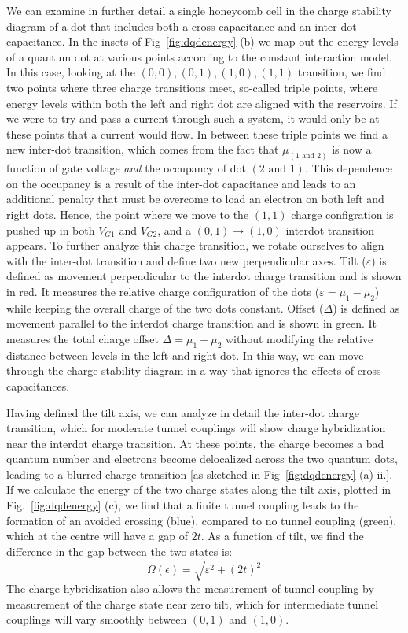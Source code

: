 We can examine in further detail a single honeycomb cell in the charge stability diagram of a dot that includes both a cross-capacitance and an inter-dot capacitance.
In the insets of Fig~\ref{fig:dqdenergy} (b) we map out the energy levels of a quantum dot at various points according to the constant interaction model.
In this case, looking at the $(0, 0), (0, 1), (1, 0), (1, 1)$ transition, we find two points where
three charge transitions meet, so-called triple points, where energy levels within both the left and right dot are aligned
with the reservoirs. If we were to try and pass a current through such a system, it would only be at these points that a
current would flow. In between these triple points we find a new inter-dot transition, which comes from the fact that $\mu_{(1 \textrm{~and~} 2)}$
is now a function of gate voltage \emph{and} the occupancy of dot $(2 \textrm{~and~} 1)$. This dependence on the
occupancy is a result of the inter-dot capacitance and leads to an additional penalty that must be
overcome to load an electron on both left and right dots. Hence, the point where we move to the $(1, 1)$ charge configration is
pushed up in both $V_{G1}$ and $V_{G2}$, and a $(0, 1) \rightarrow (1, 0)$ interdot transition appears. To further analyze this charge transition,
we rotate ourselves to align with the inter-dot transition and define two new perpendicular axes.
Tilt ($\varepsilon$) is defined as movement perpendicular to the interdot charge transition and is shown in red. It measures the relative
charge configuration of the dots ($\varepsilon = \mu_1 - \mu_2$) while keeping the overall charge of the two dots constant.
Offset ($\Delta$) is defined as movement parallel to the interdot charge transition and is shown in green.
It measures the total charge offset $\Delta = \mu_1 + \mu_2$ without modifying the relative distance between levels in the left
and right dot. In this way, we can move through the charge stability diagram in a way that ignores the effects of cross capacitances\cite{qubyte}.

Having defined the tilt axis, we can analyze in detail the inter-dot charge transition, which for moderate tunnel couplings will show
charge hybridization near the interdot charge transition. At these points, the charge becomes a bad quantum number and electrons become delocalized
across the two quantum dots, leading to a blurred charge transition [as sketched in Fig~\ref{fig:dqdenergy} (a) ii.]. If we calculate the energy
of the two charge states along the tilt axis, plotted in Fig.~\ref{fig:dqdenergy} (c), we find that a finite tunnel coupling leads to the
formation of an avoided crossing (blue), compared to no tunnel coupling (green), which at the centre will have a gap of $2t$. As a function of
tilt, we find the difference in the gap between the two states is:
\begin{equation}
  \Omega(\epsilon) = \sqrt{\varepsilon^2 + (2 t)^2}
\end{equation}
The charge hybridization also allows the measurement of tunnel coupling by measurement of the charge state near zero tilt,
which for intermediate tunnel couplings will vary smoothly between $(0, 1)$ and $(1, 0)$\cite{PhysRevLett.92.226801}.

